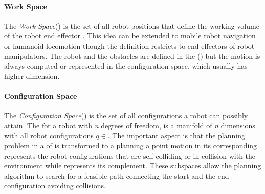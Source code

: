 \paragraph{Work Space}
The \textit{Work Space}(\WS) is the set of all robot positions that define the working volume of the robot end effector \cite{cao2011accurate}. This idea can be extended to mobile robot navigation or humanoid locomotion though the definition restricts to end effectors of robot manipulators. The robot and the obstacles are defined in the (\WS) but the motion is always computed or represented in the configuration space, which usually has higher dimension.  

\paragraph{Configuration Space}


The \textit{Configuration Space}(\CS{}) is the set of all configurations a robot can possibly attain. The \CS{} for a robot with \textit{n} degrees of freedom, is a manifold \M{} of \textit{n} dimensions with all robot configurations $q\in$\M{}. The important aspect is that the planning problem in a \WS{} of \sethree{} is transformed to a planning a point motion in its corresponding \CS{}. \CSobst{} represents the robot configurations that are self-colliding or in collision with the environment while \CSfree{} represents its complement. These subspaces allow the planning algorithm to search for a feasible path connecting the start and the end configuration avoiding collisions. 


